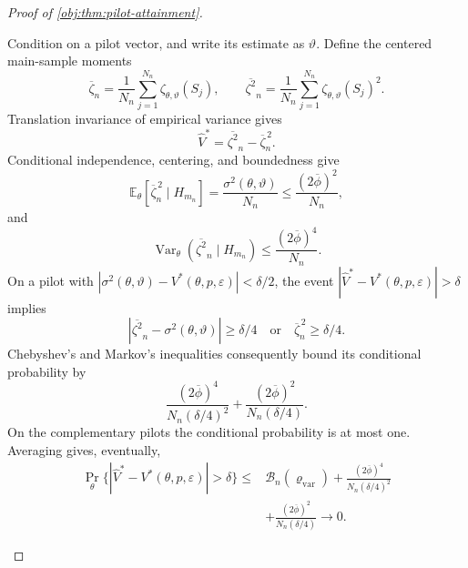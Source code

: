 \documentclass[11pt]{article}
\begin{document}
\begin{proof}[Proof of \cref{obj:thm:pilot-attainment}]
\begin{enumerate}
Condition on a pilot vector, and write its estimate as \(\vartheta\). Define the centered main-sample moments
\[
\overline\zeta_n
=\frac1{N_n}\sum_{j=1}^{N_n}\zeta_{\theta,\vartheta}(S_j),
\qquad
\overline{\zeta^2}_n
=\frac1{N_n}\sum_{j=1}^{N_n}\zeta_{\theta,\vartheta}(S_j)^2.
\]
Translation invariance of empirical variance gives
\[
\widehat V^*=\overline{\zeta^2}_n-\overline\zeta_n^{\,2}.
\]
Conditional independence, centering, and boundedness give
\[
\mathbb E_\theta[\overline\zeta_n^{\,2}\mid H_{m_n}]
=\frac{\sigma^2(\theta,\vartheta)}{N_n}
\le\frac{(2\overline\phi)^2}{N_n},
\]
and
\[
\operatorname{Var}_\theta(\overline{\zeta^2}_n\mid H_{m_n})
\le\frac{(2\overline\phi)^4}{N_n}.
\]
On a pilot with
\(|\sigma^2(\theta,\vartheta)-V^*(\theta,p,\varepsilon)|<\delta/2\),
the event \(|\widehat V^*-V^*(\theta,p,\varepsilon)|>\delta\) implies
\[
|\overline{\zeta^2}_n-\sigma^2(\theta,\vartheta)|\ge\delta/4
\quad\text{or}\quad
\overline\zeta_n^{\,2}\ge\delta/4.
\]
Chebyshev's and Markov's inequalities consequently bound its conditional probability by
\[
\frac{(2\overline\phi)^4}{N_n(\delta/4)^2}
+\frac{(2\overline\phi)^2}{N_n(\delta/4)}.
\]
On the complementary pilots the conditional probability is at most one. Averaging gives, eventually,
\[
\begin{aligned}
\Pr_\theta\{|\widehat V^*-V^*(\theta,p,\varepsilon)|>\delta\}
\le{}&
\mathcal B_n(\varrho_{\mathrm{var}})
+\frac{(2\overline\phi)^4}{N_n(\delta/4)^2}\\
&+\frac{(2\overline\phi)^2}{N_n(\delta/4)}
\longrightarrow0.
\end{aligned}
\]


\end{enumerate}
\end{proof}
\end{document}
